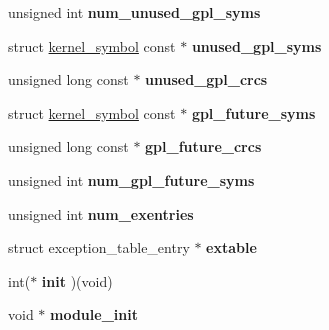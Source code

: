 \begin{DoxyCompactItemize}
\item 
\hypertarget{structmodule_a282b77196d7e8544ae16d34492990831}{}unsigned int {\bfseries num\+\_\+unused\+\_\+gpl\+\_\+syms}\label{structmodule_a282b77196d7e8544ae16d34492990831}

\item 
\hypertarget{structmodule_a5bb4a84afc6a7c923b8ed403cef8bfcd}{}struct \hyperlink{structkernel__symbol}{kernel\+\_\+symbol} const $\ast$ {\bfseries unused\+\_\+gpl\+\_\+syms}\label{structmodule_a5bb4a84afc6a7c923b8ed403cef8bfcd}

\item 
\hypertarget{structmodule_a2542719954625c28c664f1615af3c2db}{}unsigned long const $\ast$ {\bfseries unused\+\_\+gpl\+\_\+crcs}\label{structmodule_a2542719954625c28c664f1615af3c2db}

\item 
\hypertarget{structmodule_a914d79f305c5e8228e43edfccc023f43}{}struct \hyperlink{structkernel__symbol}{kernel\+\_\+symbol} const $\ast$ {\bfseries gpl\+\_\+future\+\_\+syms}\label{structmodule_a914d79f305c5e8228e43edfccc023f43}

\item 
\hypertarget{structmodule_a58bb2dca0d1564d4d5def4a9ee739596}{}unsigned long const $\ast$ {\bfseries gpl\+\_\+future\+\_\+crcs}\label{structmodule_a58bb2dca0d1564d4d5def4a9ee739596}

\item 
\hypertarget{structmodule_ad8e01f21bb472e9bfb501f3b16321542}{}unsigned int {\bfseries num\+\_\+gpl\+\_\+future\+\_\+syms}\label{structmodule_ad8e01f21bb472e9bfb501f3b16321542}

\item 
\hypertarget{structmodule_ab803a4167ed3dc61c1c292b879b54206}{}unsigned int {\bfseries num\+\_\+exentries}\label{structmodule_ab803a4167ed3dc61c1c292b879b54206}

\item 
\hypertarget{structmodule_a14252d12f4842cfd81db95574054c35a}{}struct exception\+\_\+table\+\_\+entry $\ast$ {\bfseries extable}\label{structmodule_a14252d12f4842cfd81db95574054c35a}

\item 
\hypertarget{structmodule_a64c01b70440eb07371602d9ab46b73a0}{}int($\ast$ {\bfseries init} )(void)\label{structmodule_a64c01b70440eb07371602d9ab46b73a0}

\item 
\hypertarget{structmodule_a703b6538512ee59a6c48ae3cf96265a4}{}void $\ast$ {\bfseries module\+\_\+init}\label{structmodule_a703b6538512ee59a6c48ae3cf96265a4}


\end{DoxyCompactItemize}

